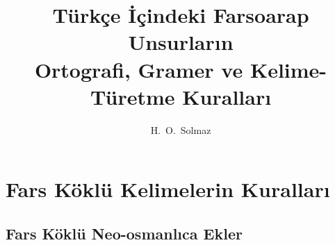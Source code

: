 \documentclass[a5paper,10pt, twoside]{scrbook}
\title{\LARGE\sffamily Türkçe İçindeki Farsoarap Unsurların \\
  Ortografi, Gramer ve Kelime-Türetme Kuralları}
\author{H.\ O.\ Solmaz}
\date{}
\begin{document}
\maketitle
\tableofcontents







\chapter{Fars Köklü Kelimelerin Kuralları}
\section{Fars Köklü Neo-osmanlıca Ekler}


\end{document}

